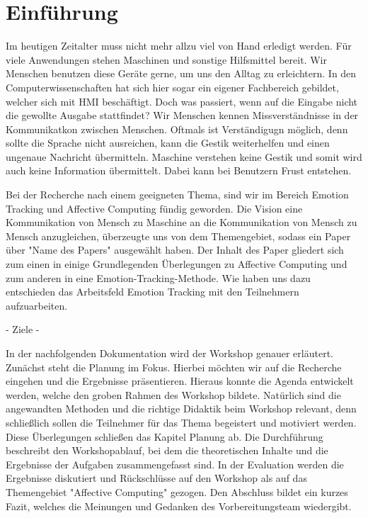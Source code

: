 \section{Einführung}

Im heutigen Zeitalter muss nicht mehr allzu viel von Hand erledigt werden. Für viele Anwendungen stehen Maschinen und sonstige Hilfsmittel bereit. Wir Menschen benutzen diese Geräte gerne, um uns den Alltag zu erleichtern. In den Computerwissenschaften hat sich hier sogar ein eigener Fachbereich gebildet, welcher sich mit HMI beschäftigt. Doch was passiert, wenn auf die Eingabe nicht die gewollte Ausgabe stattfindet? Wir Menschen kennen Missverständnisse in der Kommunikatkon zwischen Menschen. Oftmals ist Verständigugn möglich, denn sollte die Sprache nicht ausreichen, kann die Gestik weiterhelfen und einen ungenaue Nachricht übermitteln. Maschine verstehen keine Gestik und somit wird auch keine Information übermittelt. Dabei kann bei Benutzern Frust entstehen. 


Bei der Recherche nach einem geeigneten Thema, sind wir im Bereich Emotion Tracking und Affective Computing fündig geworden. Die Vision eine Kommunikation von Mensch zu Maschine an die Kommunikation von Mensch zu Mensch anzugleichen, überzeugte uns von dem Themengebiet, sodass ein Paper über "Name des Papers" ausgewählt haben. Der Inhalt des Paper gliedert sich zum einen in einige Grundlegenden Überlegungen zu Affective Computing und zum anderen in eine Emotion-Tracking-Methode. Wie haben uns dazu entschieden das Arbeitsfeld Emotion Tracking mit den Teilnehmern aufzuarbeiten.



- Ziele -





In der nachfolgenden Dokumentation wird der Workshop genauer erläutert. Zunächst steht die Planung im Fokus. Hierbei möchten wir auf die Recherche eingehen und die Ergebnisse präsentieren. Hieraus konnte die Agenda entwickelt werden, welche den groben Rahmen des Workshop bildete. Natürlich sind die angewandten Methoden und die richtige Didaktik beim Workshop relevant, denn schließlich sollen die Teilnehmer für das Thema begeistert und motiviert werden.
Diese Überlegungen schließen das Kapitel Planung ab. Die Durchführung beschreibt den Workshopablauf, bei dem die theoretischen Inhalte und die Ergebnisse der Aufgaben zusammengefasst sind. In der Evaluation werden die Ergebnisse diskutiert und Rückschlüsse auf den Workshop als auf das Themengebiet "Affective Computing" gezogen. Den Abschluss bildet ein kurzes Fazit, welches die Meinungen und Gedanken des Vorbereitungsteam wiedergibt. 
